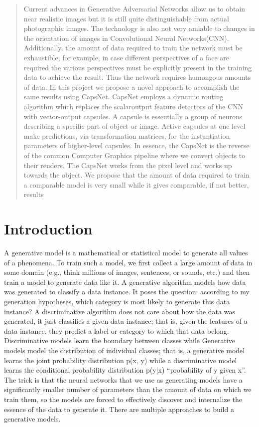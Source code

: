 \documentclass{vldb}
\begin{document}
\begin{abstract}
Current advances in Generative Adversarial Networks allow us to obtain near realistic
images but it is still quite distinguishable from actual photographic images. The
technology is also not very amiable to changes in the orientation of images in Convolutional
Neural Networks(CNN). Additionally, the amount of data required to train
the network must be exhaustible, for example, in case different perspectives of a face
are required the various perspectives must be explicitly present in the training data to
achieve the result. Thus the network requires humongous amounts of data.
In this project we propose a novel approach to accomplish the same results using
CapsNet. CapsNet employs a dynamic routing algorithm which replaces the scalaroutput
feature detectors of the CNN with vector-output capsules. A capsule is essentially
a group of neurons describing a specific part of object or image. Active capsules
at one level make predictions, via transformation matrices, for the instantiation parameters
of higher-level capsules. In essence, the CapsNet is the reverse of the common
Computer Graphics pipeline where we convert objects to their renders. The CapsNet
works from the pixel level and works up towards the object.
We propose that the amount of data required to train a comparable model is very
small while it gives comparable, if not better, results
\end{abstract}




\section{Introduction}
A generative model is a mathematical or statistical model to generate all values of
a phenomena. To train such a model, we first collect a large amount of data in some
domain (e.g., think millions of images, sentences, or sounds, etc.) and then train a
model to generate data like it.
A generative algorithm models how data was generated to classify a data instance.
It poses the question: according to my generation hypotheses, which category is most
likely to generate this data instance? A discriminative algorithm does not care about
how the data was generated, it just classifies a given data instance; that is, given the
features of a data instance, they predict a label or category to which that data belong.
Discriminative models learn the boundary between classes while Generative models
model the distribution of individual classes; that is, a generative model learns the joint
probability distribution p(x, y) while a discriminative model learns the conditional
probability distribution p(y|x) “probability of y given x”.
The trick is that the neural networks that we use as generating models have a significantly
smaller number of parameters than the amount of data on which we train
them, so the models are forced to effectively discover and internalize the essence of
the data to generate it.
There are multiple approaches to build a generative models. 
\end{document}
